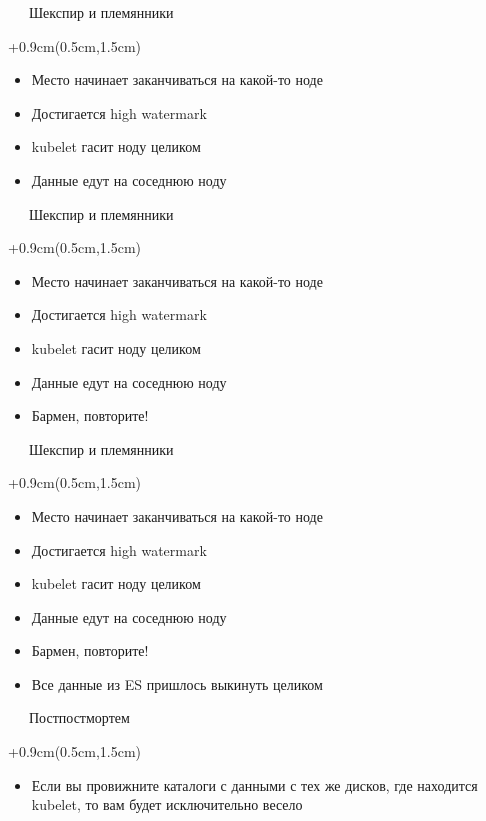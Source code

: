 \documentclass[xetex,18pt,aspectratio=43]{beamer}
\begin{document}
\begin{Large}
\begin{frame}{\ \ \ Шекспир и племянники}
\begin{textblock*}{\framewidth+0.9cm}(0.5cm,1.5cm)
\begin{itemize}
  \item Место начинает заканчиваться на какой-то ноде
  \item Достигается high watermark
  \item kubelet гасит ноду целиком
  \item Данные едут на соседнюю ноду
\end{itemize}
\end{textblock*}
\end{frame}

\begin{frame}{\ \ \ Шекспир и племянники}
\begin{textblock*}{\framewidth+0.9cm}(0.5cm,1.5cm)
\begin{itemize}
  \item Место начинает заканчиваться на какой-то ноде
  \item Достигается high watermark
  \item kubelet гасит ноду целиком
  \item Данные едут на соседнюю ноду
  \item Бармен, повторите!
\end{itemize}
\end{textblock*}
\end{frame}

\begin{frame}{\ \ \ Шекспир и племянники}
\begin{textblock*}{\framewidth+0.9cm}(0.5cm,1.5cm)
\begin{itemize}
  \item Место начинает заканчиваться на какой-то ноде
  \item Достигается high watermark
  \item kubelet гасит ноду целиком
  \item Данные едут на соседнюю ноду
  \item Бармен, повторите!
  \item Все данные из ES пришлось выкинуть целиком
\end{itemize}
\end{textblock*}
\end{frame}

\begin{frame}{\ \ \ Постпостмортем}
\begin{textblock*}{\framewidth+0.9cm}(0.5cm,1.5cm)
\begin{itemize}
  \item Если вы провижните каталоги с данными с тех же дисков, где находится
    kubelet, то вам будет исключительно весело
\end{itemize}
\end{textblock*}
\end{frame}


\end{Large}
\end{document}
